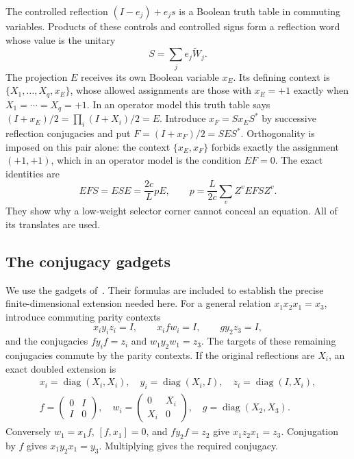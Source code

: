 The controlled reflection $(I-e_j)+e_js$ is a Boolean truth table in commuting variables. Products of these controls and controlled signs form a reflection word whose value is the unitary
\[
 S=\sum_j e_j\widetilde W_j.
\]
The projection $E$ receives its own Boolean variable $x_E$. Its defining context is $\{X_1,\ldots,X_q,x_E\}$, whose allowed assignments are those with $x_E=+1$ exactly when $X_1=\cdots=X_q=+1$. In an operator model this truth table says $(I+x_E)/2=\prod_i(I+X_i)/2=E$. Introduce $x_F=Sx_ES^*$ by successive reflection conjugacies and put $F=(I+x_F)/2=SES^*$. Orthogonality is imposed on this pair alone: the context $\{x_E,x_F\}$ forbids exactly the assignment $(+1,+1)$, which in an operator model is the condition $EF=0$. The exact identities are
\begin{equation}\label{eq:selector-split}
 EFS=ESE=\frac{2c}{L}pE,\qquad
 p=\frac{L}{2c}\sum_v Z^vEFSZ^v.
\end{equation}
They show why a low-weight selector corner cannot conceal an equation. All of its translates are used.

\subsection{The conjugacy gadgets}
We use the gadgets of~\cite[Lemma~5.8]{FKMPRSZ25}. Their formulas are included to establish the precise finite-dimensional extension needed here. For a general relation $x_1x_2x_1=x_3$, introduce commuting parity contexts
\[
 x_i y_i z_i=I,\qquad x_i f w_i=I,\qquad gy_2z_3=I,
\]
and the conjugacies $fy_if=z_i$ and $w_1y_2w_1=z_3$. The targets of these remaining conjugacies commute by the parity contexts. If the original reflections are $X_i$, an exact doubled extension is
\begin{gather*}
 x_i=\operatorname{diag}(X_i,X_i),\quad
 y_i=\operatorname{diag}(X_i,I),\quad z_i=\operatorname{diag}(I,X_i),\\
 f=\begin{pmatrix}0&I\\I&0\end{pmatrix},\quad
 w_i=\begin{pmatrix}0&X_i\\X_i&0\end{pmatrix},\quad
 g=\operatorname{diag}(X_2,X_3).
\end{gather*}
Conversely $w_1=x_1f$, $[f,x_1]=0$, and $fy_2f=z_2$ give $x_1z_2x_1=z_3$. Conjugation by $f$ gives $x_1y_2x_1=y_3$. Multiplying gives the required conjugacy.


